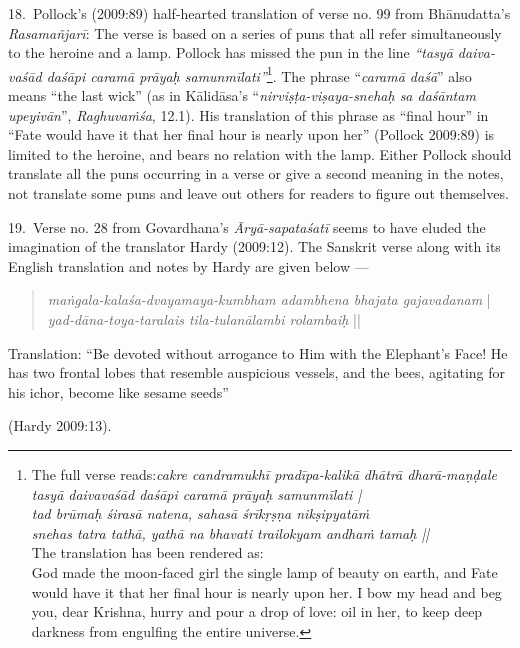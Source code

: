18.~Pollock’s (2009:89) half-hearted translation of verse no. 99 from Bhānudatta’s \textsl{Rasamañjarī}: The verse is based on a series of puns that all refer simultaneously to the heroine and a lamp. Pollock has missed the pun in the line \textsl{“tasyā daiva-vaśād daśāpi caramā prāyaḥ samunmīlati”}\footnote[11]{The full verse reads:\textsl{cakre candramukhī pradīpa-kalikā dhātrā dharā-maṇḍale}\\
\textsl{tasyā daivavaśād daśāpi caramā prāyaḥ samunmīlati |}\\
\textsl{tad brūmaḥ śirasā natena, sahasā śrīkṛṣṇa nikṣipyatāṁ}\\
\textsl{snehas tatra tathā, yathā na bhavati trailokyam andhaṁ tamaḥ ||}\\
The translation has been rendered as:\\
God made the moon-faced girl the single lamp of beauty on earth, and Fate would have it that her final hour is nearly upon her. I bow my head and beg you, dear Krishna, hurry and pour a drop of love: oil in her, to keep deep darkness from engulfing the entire universe.}. The phrase “\textsl{caramā daśā}” also means “the last wick” (as in Kālidāsa’s “\textsl{nirviṣṭa-viṣaya-snehaḥ sa daśāntam upeyivān}”, \textsl{Raghuvaṁśa}, 12.1). His translation of this phrase as “final hour” in “Fate would have it that her final hour is nearly upon her” (Pollock 2009:89) is limited to the heroine, and bears no relation with the lamp. Either Pollock should translate all the puns occurring in a verse or give a second meaning in the notes, not translate some puns and leave out others for readers to figure out themselves.

\newpage

19.~Verse no. 28 from Govardhana’s \textsl{Āryā-sapataśatī} seems to have eluded the imagination of the translator Hardy (2009:12). The Sanskrit verse along with its English translation and notes by Hardy are given below --- 
\begin{quote}
\textsl{maṅgala-kalaśa-dvayamaya-kumbham adambhena bhajata gajavadanam} |\\
\textsl{yad-dāna-toya-taralais tila-tulanālambi rolambaiḥ} ||
\end{quote}

\begin{myquote}
Translation: “Be devoted without arrogance to Him with the Elephant’s Face! He has two frontal lobes that resemble auspicious vessels, and the bees, agitating for his ichor, become like sesame seeds” 

\hfill(Hardy 2009:13).
\end{myquote}

